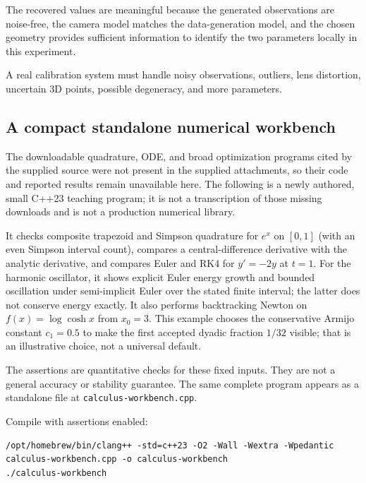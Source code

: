 The recovered values are meaningful because the generated observations are noise-free, the camera model matches the data-generation model, and the chosen geometry provides sufficient information to identify the two parameters locally in this experiment.

A real calibration system must handle noisy observations, outliers, lens distortion, uncertain 3D points, possible degeneracy, and more parameters.

\subsection{A compact standalone numerical workbench}\label{02-foundations-ii-ch028-a-compact-standalone-numerical-workbench}

The downloadable quadrature, ODE, and broad optimization programs cited by the supplied source were not present in the supplied attachments, so their code and reported results remain unavailable here. The following is a newly authored, small C++23 teaching program; it is not a transcription of those missing downloads and is not a production numerical library.

It checks composite trapezoid and Simpson quadrature for \(e^x\) on \([0,1]\) (with an even Simpson interval count), compares a central-difference derivative with the analytic derivative, and compares Euler and RK4 for \(y'=-2y\) at \(t=1\). For the harmonic oscillator, it shows explicit Euler energy growth and bounded oscillation under semi-implicit Euler over the stated finite interval; the latter does not conserve energy exactly. It also performs backtracking Newton on \(f(x)=\log\cosh x\) from \(x_0=3\). This example chooses the conservative Armijo constant \(c_1=0.5\) to make the first accepted dyadic fraction \(1/32\) visible; that is an illustrative choice, not a universal default.

The assertions are quantitative checks for these fixed inputs. They are not a general accuracy or stability guarantee. The same complete program appears as a standalone file at {\texttt{calculus-workbench.cpp}}.

Compile with assertions enabled:

\begin{verbatim}
/opt/homebrew/bin/clang++ -std=c++23 -O2 -Wall -Wextra -Wpedantic calculus-workbench.cpp -o calculus-workbench
./calculus-workbench
\end{verbatim}

